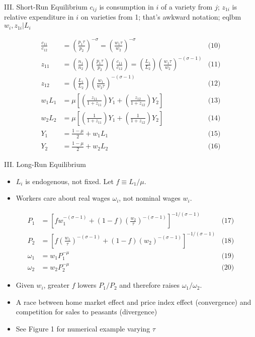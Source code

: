 \documentclass[11pt,notes=hide,aspectratio=169]{beamer}
\begin{document}
\begin{frame}{III. Short-Run Equilibrium}
$c_{ij}$ is consumption in $i$ of a variety from $j$; 
$z_{1i}$ is relative expenditure in $i$ on varieties from 1;
that's awkward notation;
eqlbm $w_i,z_{1i}\vert L_i$
\begin{small}
\begin{align*}
\frac{c_{11}}{c_{12}} 
&= \left(\frac{p_1\tau}{p_2}\right)^{-\sigma} 
= \left(\frac{w_1\tau}{w_2}\right)^{-\sigma}
&
\text{(10)}
\\
z_{11} &= \left(\frac{n_1}{n_2}\right)  \left(\frac{p_1\tau}{p_2}\right) \left(\frac{c_{11}}{c_{12}}\right) 
= \left(\frac{L_1}{L_2}\right) \left(\frac{w_1\tau}{w_2}\right)^{-(\sigma-1)}
&
\text{(11)}
\\
z_{12} 
&=
\left(\frac{L_1}{L_2}\right) \left(\frac{w_1}{w_2\tau}\right)^{-(\sigma-1)}
&
\text{(12)}
\\
w_1 L_1 &= 
\mu \left[\left(\frac{z_{11}}{1+z_{11}}\right) Y_1 + \left(\frac{z_{12}}{1+z_{12}}\right) Y_2   \right]
&
\text{(13)}
\\
w_2 L_2 &= 
\mu \left[\left(\frac{1}{1+z_{11}}\right) Y_1 + \left(\frac{1}{1+z_{12}}\right) Y_2   \right]
&
\text{(14)}
\\
Y_1 &= \frac{1-\mu}{2} + w_1 L_1
&
\text{(15)}
\\
Y_2 &= \frac{1-\mu}{2} + w_2 L_2
&
\text{(16)}
\end{align*}
\end{small}
\end{frame}
\begin{frame}{III. Long-Run Equilibrium}
\begin{itemize}
\item $L_i$ is endogenous, not fixed. Let $f \equiv L_1/\mu$.
\item Workers care about real wages $\omega_i$, not nominal wages $w_i$.
\end{itemize}
\begin{align*}
P_1 &= \left[fw_1^{-(\sigma-1)} + (1-f) \left(\frac{w_2}{\tau}\right)^{-(\sigma-1)} \right]^{-1/(\sigma-1)}
&
\text{(17)}
\\
P_2 &= \left[f\left(\frac{w_1}{\tau}\right)^{-(\sigma-1)} + (1-f) \left(w_2\right)^{-(\sigma-1)} \right]^{-1/(\sigma-1)}
&
\text{(18)}
\\
\omega_1 &= w_1 P_1^{-\mu}
&
\text{(19)}
\\
\omega_2 &= w_2 P_2^{-\mu}
&
\text{(20)}
\end{align*}
\vspace{-6mm}
\begin{itemize}
	\item Given $w_i$, greater $f$ lowers $P_1/P_2$ and therefore raises $\omega_1/\omega_2$.
	\item A race between home market effect and price index effect (convergence) and competition for sales to peasants (divergence)
	\item See Figure 1 for numerical example varying $\tau$
\end{itemize}
\end{frame}
\end{document}
